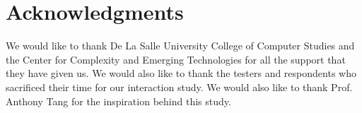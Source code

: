 \documentclass{sigchi}
\begin{document}
\section{Acknowledgments}
We would like to thank De La Salle University College of Computer Studies and the Center for Complexity and Emerging Technologies for all the support that they have given us. We would also like to thank the testers and respondents who sacrificed their time for our interaction study. We would also like to thank Prof. Anthony Tang for the inspiration behind this study. 

%
%
%
%
%
\balance{}

\end{document}
